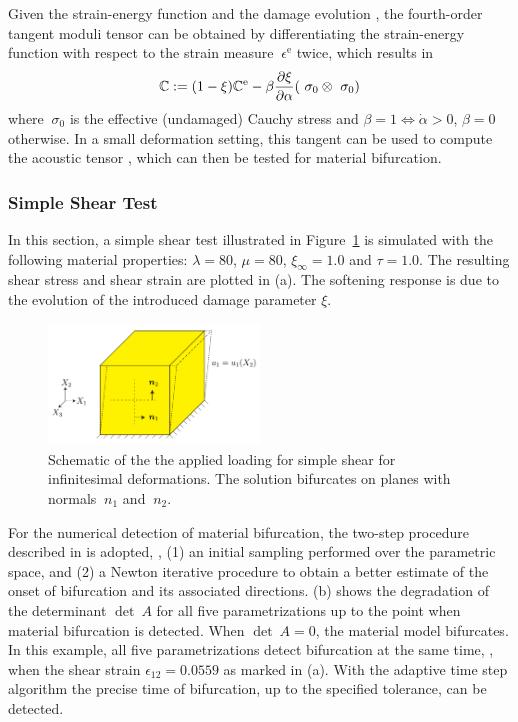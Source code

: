 \documentclass[12pt]{article}
\numberwithin{equation}{section}
\begin{document}
Given the strain-energy function  and the damage
evolution , the fourth-order tangent moduli tensor can
be obtained by differentiating the strain-energy function with respect
to the strain measure $~\epsilon^{\text{e}}$ twice, which results in
\begin{equation}
  \mathbb{C} := (1-\xi)\mathbb{C}^{\text{e}}
    - \beta \frac{\partial\xi}{\partial\alpha}
    (~\sigma_0\otimes~\sigma_0)
\end{equation}
where $~\sigma_0$ is the effective (undamaged) Cauchy stress and
$\beta = 1 \Leftrightarrow \dot{\alpha} > 0$, $\beta=0$ otherwise. In
a small deformation setting, this tangent can be used to compute the
acoustic tensor , which can then be tested
for material bifurcation.

\subsubsection{Simple Shear Test}

In this section, a simple shear test illustrated in
Figure~\ref{fig:simple_shear} is simulated with the following material
properties: $\lambda = 80$, $\mu = 80$, $\xi_{\infty} = 1.0$ and
$\tau = 1.0$. The resulting shear stress and shear strain are plotted
in (a). The softening response is due to
the evolution of the introduced damage parameter $\xi$.
\begin{figure}[!htbp]
 \centering
      \includegraphics[width=0.5\textwidth]{figs/simple_shear_schematic.pdf}
      \caption{Schematic of the the applied loading for simple shear
        for infinitesimal deformations. The solution bifurcates on
        planes with normals $~n_{1}$ and $~n_{2}$.}
      \label{fig:simple_shear}
\end{figure}
For the numerical detection of material bifurcation, the two-step
procedure described in  is adopted, \ie, (1) an
initial sampling performed over the parametric space, and (2) a Newton
iterative procedure to obtain a better estimate of the onset of
bifurcation and its associated directions.
(b) shows the degradation of the
determinant $\det~A$ for all five parametrizations up to the point
when material bifurcation is detected. When $\det~A = 0$, the material
model bifurcates. In this example, all five parametrizations detect
bifurcation at the same time, \ie, when the shear strain
$\epsilon_{12}=0.0559$ as marked in 
(a). With the adaptive time step algorithm the precise time of
bifurcation, up to the specified tolerance, can be detected.
\end{document}
